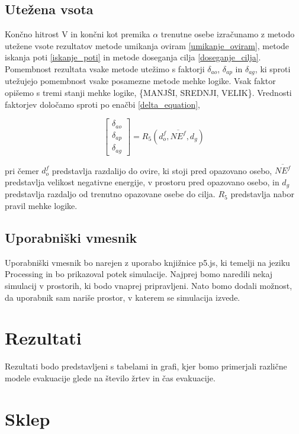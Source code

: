 \documentclass[9pt]{pnas-new}
\begin{document}
\subsection*{Utežena vsota}
Končno hitrost V in končni kot premika ${\alpha}$ trenutne osebe izračunamo z metodo utežene vsote rezultatov metode umikanja oviram \ref{umikanje_oviram}, metode iskanja poti \ref{iskanje_poti} in metode doseganja cilja \ref{doseganje_cilja}. Pomembnost rezultata vsake metode utežimo s faktorji ${\delta_{ao}}$, ${\delta_{ap}}$ in ${\delta_{ag}}$, ki sproti utežujejo pomembnost vsake posamezne metode mehke logike. Vsak faktor opišemo s tremi stanji mehke logike, \{MANJŠI, SREDNJI, VELIK\}. Vrednosti faktorjev določamo sproti po enačbi \ref{delta_equation},

\begin{equation}
\label{delta_equation}
\begin{bmatrix}
\delta_{ao}\\
\delta_{ap}\\
\delta_{ag}
\end{bmatrix} = R_{5} (d_{o}^f, \overline{NE^f}, d_{g})
\end{equation}

pri čemer ${d_{o}^f}$ predstavlja razdalijo do ovire, ki stoji pred opazovano osebo, ${\overline{NE^f}}$ predstavlja velikost negativne energije, v prostoru pred opazovano osebo, in ${d_{g}}$ predstavlja razdaljo od trenutno opazovane osebe do cilja. ${R_{5}}$ predstavlja nabor pravil mehke logike. 

\subsection*{Uporabniški vmesnik}
Uporabniški vmesnik bo narejen z uporabo knjižnice p5.js, ki temelji na jeziku Processing in bo prikazoval potek simulacije. Najprej bomo naredili nekaj simulacij v prostorih, ki bodo vnaprej pripravljeni. Nato bomo dodali možnost, da uporabnik sam nariše prostor, v katerem se simulacija izvede.

\section*{Rezultati}
Rezultati bodo predstavljeni s tabelami in grafi, kjer bomo primerjali različne modele evakuacije glede na število žrtev in čas evakuacije. 

\section*{Sklep}
\end{document}
